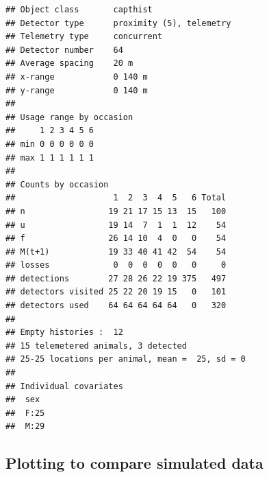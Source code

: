 \documentclass[
]{book}
\begin{document}
\begin{verbatim}
## Object class       capthist 
## Detector type      proximity (5), telemetry 
## Telemetry type     concurrent 
## Detector number    64 
## Average spacing    20 m 
## x-range            0 140 m 
## y-range            0 140 m 
## 
## Usage range by occasion
##     1 2 3 4 5 6
## min 0 0 0 0 0 0
## max 1 1 1 1 1 1
## 
## Counts by occasion 
##                    1  2  3  4  5   6 Total
## n                 19 21 17 15 13  15   100
## u                 19 14  7  1  1  12    54
## f                 26 14 10  4  0   0    54
## M(t+1)            19 33 40 41 42  54    54
## losses             0  0  0  0  0   0     0
## detections        27 28 26 22 19 375   497
## detectors visited 25 22 20 19 15   0   101
## detectors used    64 64 64 64 64   0   320
## 
## Empty histories :  12 
## 15 telemetered animals, 3 detected
## 25-25 locations per animal, mean =  25, sd = 0 
## 
## Individual covariates
##  sex   
##  F:25  
##  M:29
\end{verbatim}

\subsection{Plotting to compare simulated data}\label{plotting-to-compare-simulated-data}
\end{document}
